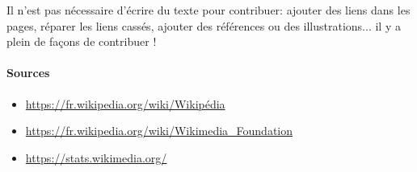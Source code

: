 \documentclass[12pt]{../fiche}
\begin{document}
Il n'est pas nécessaire d'écrire du texte pour contribuer: ajouter des liens
dans les pages, réparer les liens cassés, ajouter des références ou des
illustrations... il y a plein de façons de contribuer !


\paragraph{Sources}
\begin{itemize}
    \item \url{https://fr.wikipedia.org/wiki/Wikipédia}
    \item \url{https://fr.wikipedia.org/wiki/Wikimedia_Foundation}
    \item \url{https://stats.wikimedia.org/}
\end{itemize}
\end{document}
